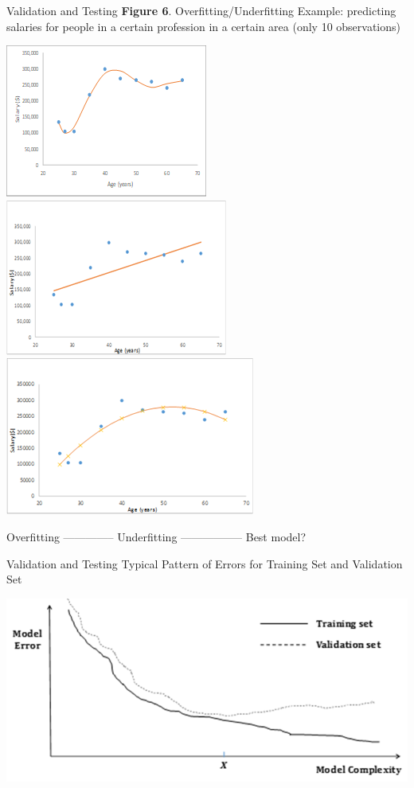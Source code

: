 \documentclass[11pt]{beamer}
\begin{document}
\begin{frame}{Validation and Testing}
\textbf{Figure 6}. Overfitting/Underfitting Example: predicting salaries for people in a certain profession in a certain area (only 10 observations)
	\begin{center}
	\includegraphics[scale=.5]{../05-pictures/lesson-2-1_pic_10.png}  \hfill
	\includegraphics[scale=.5]{../05-pictures/lesson-2-1_pic_11.png}  \hfill
	\includegraphics[scale=.5]{../05-pictures/lesson-2-1_pic_12.png}
	\end{center}
	Overfitting -------------- Underfitting	 ----------------- Best model?
\end{frame}
%
%
\begin{frame}{Validation and Testing}
Typical Pattern of Errors for Training Set and Validation Set	
	\begin{center}
	\includegraphics[scale=.6]{../05-pictures/lesson-2-1_pic_13.png}
	\end{center}
\end{frame}
\end{document}
